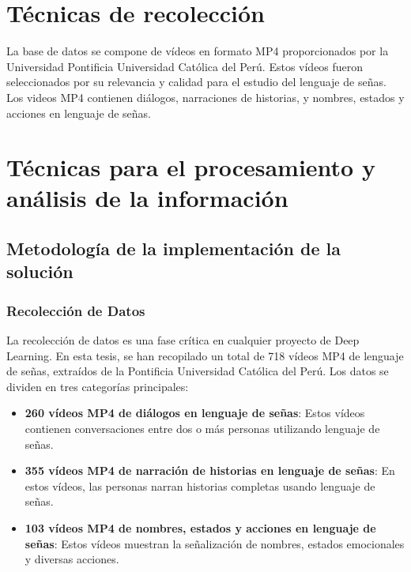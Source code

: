 \section{Técnicas de recolección}
	
	La base de datos se compone de vídeos en formato MP4 proporcionados por la Universidad Pontificia Universidad Católica del Perú. Estos vídeos fueron seleccionados por su relevancia y calidad para el estudio del lenguaje de señas. Los videos MP4 contienen diálogos, narraciones de historias, y nombres, estados y acciones en lenguaje de señas.


\section{Técnicas para el procesamiento y análisis de la información}

\subsection{Metodología de la implementación de la solución}

\subsubsection{Recolección de Datos}
La recolección de datos es una fase crítica en cualquier proyecto de Deep Learning. En esta tesis, se han recopilado un total de 718 vídeos MP4 de lenguaje de señas, extraídos de la Pontificia Universidad Católica del Perú. Los datos se dividen en tres categorías principales:
\begin{itemize}
	\item \textbf{260 vídeos MP4 de diálogos en lenguaje de señas}: Estos vídeos contienen conversaciones entre dos o más personas utilizando lenguaje de señas.
	\item \textbf{355 vídeos MP4 de narración de historias en lenguaje de señas}: En estos vídeos, las personas narran historias completas usando lenguaje de señas.
	\item \textbf{103 vídeos MP4 de nombres, estados y acciones en lenguaje de señas}: Estos vídeos muestran la señalización de nombres, estados emocionales y diversas acciones.
\end{itemize}

